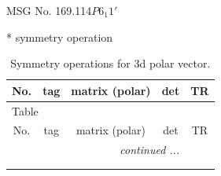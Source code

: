 \documentclass[fleqn,8pt]{jsarticle}
\begin{document}
\setcounter{MaxMatrixCols}{32}

\renewcommand{\tablename}{Table~}
\renewcommand{\figurename}{Figure~}
\begin{center}
\LARGE
MSG No. 169.114\quad$P6_{1}1'$
\end{center}
* symmetry operation
\renewcommand{\arraystretch}{1.3}
\begin{longtable}{ccccc}
\caption{Symmetry operations for 3d polar vector.}
 \\
 \hline \hline
No. & tag & matrix (polar) & det & TR \\ \hline \endfirsthead

\multicolumn{4}{l}{\tablename\ \thetable{}} \\
 \hline \hline
No. & tag & matrix (polar) & det & TR \\ \hline \endhead

 \hline \hline
\multicolumn{4}{r}{\footnotesize\it continued ...} \\ \endfoot

 \hline \hline
\multicolumn{4}{r}{} \\ \endlastfoot


\end{longtable}
\end{document}
